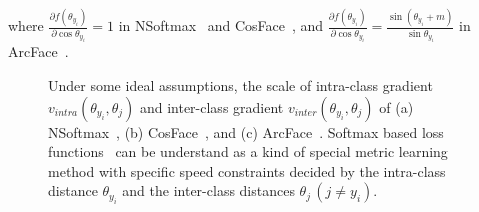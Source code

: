 \documentclass[journal,comsoc]{IEEEtran}
\begin{document}
where $\frac{{\partial f({\theta _{{y_i}}})}}{{\partial \cos {\theta _{{y_i}}}}}=1$ in NSoftmax~\cite{wang2017normface} and CosFace~\cite{Wang2018CosFace}, and $\frac{{\partial f({\theta _{{y_i}}})}}{{\partial \cos {\theta _{{y_i}}}}} = \frac{{\sin ({\theta _{{y_i}}} + m)}}{{\sin {\theta _{{y_i}}}}}$ in ArcFace~\cite{deng2019arcface}. 



\begin{figure}[htbp]
	\centering
	
	
	\caption{Under some ideal assumptions, the scale of intra-class gradient ${v_{intra}}\left( {{\theta _{{y_i}}}},{{\theta _{{j}}}}\right)$ and inter-class gradient ${v_{inter}}\left({{\theta _{{y_i}}}}, {{\theta _j}} \right)$ of (a) NSoftmax~\cite{wang2017normface}, (b) CosFace~\cite{Wang2018CosFace}, and (c) ArcFace~\cite{deng2019arcface}.  Softmax based loss functions~\cite{wang2017normface,Wang2018CosFace,deng2019arcface} can be understand as a kind of special metric learning method with specific speed constraints decided by the intra-class distance ${\theta_{y_i}}$ and the inter-class distances $\theta _{{j}}\,(j \ne {y_i})$.}
	\label{fig:soft_method_curves}
\end{figure}
\end{document}
